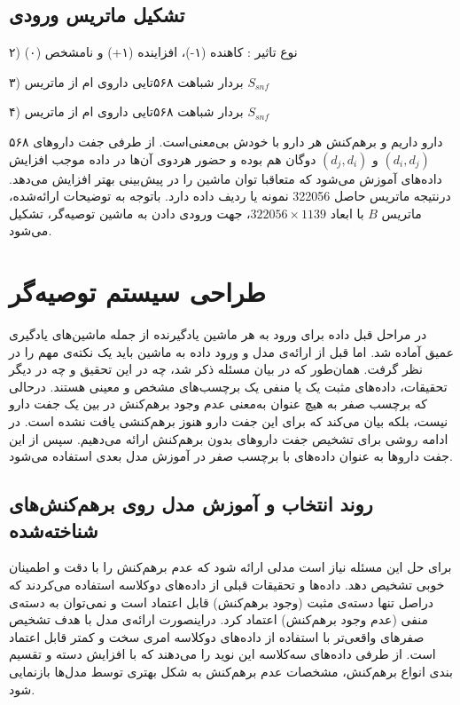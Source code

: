\subsection{تشکیل ماتریس ورودی}

۲) نوع تاثیر : کاهنده (۱-)، افزاینده (۱+) و نامشخص (۰)

۳) بردار شباهت ۵۶۸تایی داروی
ام از ماتریس
$S_{snf}$

۴) بردار شباهت ۵۶۸تایی داروی
ام از ماتریس
$S_{snf}$

۵۶۸ دارو داریم و برهم‌کنش هر دارو با خودش بی‌معنی‌است. از طرفی جفت داروهای 
$(d_i, d_j)$
و 
$(d_j, d_i)$
دوگان هم بوده و حضور هردوی آن‌ها در داده موجب افزایش داده‌های آموزش می‌شود که متعاقبا توان ماشین را در پیش‌بینی بهتر افزایش می‌دهد. درنتیجه ماتریس حاصل 322056 نمونه یا ردیف داده دارد. باتوجه به توضیحات ارائه‌شده، ماتریس 
$B$
با ابعاد 
$322056 \times 1139$،
جهت ورودی دادن به ماشین توصیه‌گر، تشکیل می‌شود.


\section{
طراحی سیستم توصیه‌گر
\label{RecomDesign}}

در مراحل قبل داده برای ورود به هر ماشین یادگیرنده از جمله ماشین‌های یادگیری عمیق آماده شد. اما قبل از ارائه‌ی مدل و ورود داده به ماشین باید یک نکته‌ی مهم را در نظر گرفت. همان‌طور که در بیان مسئله ذکر شد، چه در این تحقیق و چه در دیگر تحقیقات، داده‌های مثبت یک یا منفی یک برچسب‌های مشخص و معینی هستند. درحالی که برچسب صفر به هیچ عنوان به‌معنی عدم وجود برهم‌کنش در بین یک جفت دارو نیست، بلکه بیان می‌کند که برای این جفت دارو هنوز برهم‌کنشی یافت نشده ‌است. در ادامه روشی برای تشخیص جفت داروهای بدون برهم‌کنش ارائه می‌دهیم. سپس از این جفت داروها به عنوان داده‌های با برچسب صفر در آموزش مدل بعدی استفاده می‌شود.

\subsection{روند انتخاب و آموزش مدل روی برهم‌کنش‌های شناخته‌شده}

برای حل این مسئله نیاز است مدلی ارائه شود که عدم برهم‌کنش را با دقت و اطمینان خوبی تشخیص دهد. داده‌ها و تحقیقات قبلی از داده‌های دوکلاسه استفاده می‌کردند که دراصل تنها دسته‌ی مثبت (وجود برهم‌کنش) قابل اعتماد است و نمی‌توان به دسته‌ی منفی (عدم وجود برهم‌کنش) اعتماد کرد. دراینصورت ارائه‌ی مدل با هدف تشخیص صفرهای واقعی‌تر با استفاده از داده‌های دوکلاسه امری سخت و کمتر قابل اعتماد است. از طرفی داده‌های سه‌کلاسه این نوید را می‌دهند که با افزایش دسته‌ و تقسیم بندی انواع برهم‌کنش، مشخصات عدم بر‌هم‌کنش به شکل بهتری توسط مدل‌ها بازنمایی شود.

